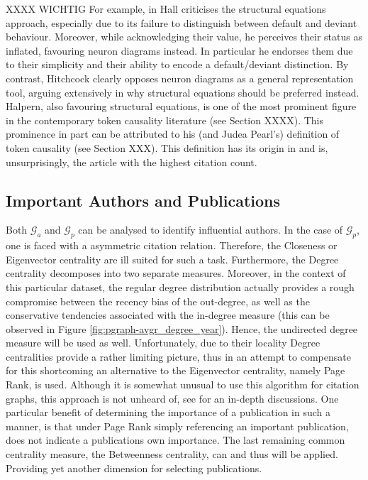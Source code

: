\documentclass[11pt,a4paper]{book}
\theoremstyle{definition}
\theoremstyle{definition}
\theoremstyle{definition}
\theoremstyle{remark}
\newcommand{\pgraph}{\mathcal{G}_{p}}
\newcommand{\agraph}{\mathcal{G}_{a}}
\begin{document}
XXXX WICHTIG For example, in \parencite{hall2007structural} Hall criticises the structural equations approach, especially due to its failure to distinguish between default and deviant behaviour. Moreover, while acknowledging their value, he perceives their status as inflated, favouring neuron diagrams instead. In particular he endorses them due to their simplicity and their ability to encode a default/deviant distinction. By contrast, Hitchcock clearly opposes neuron diagrams as a general representation tool, arguing extensively in \parencite{hitchcock2007s} why structural equations should be preferred instead.
Halpern, also favouring structural equations, is one of the most prominent figure in the contemporary token causality literature (see Section XXXX). This prominence in part can be attributed to his (and Judea Pearl's) definition of token causality (see Section XXX). This definition has its origin in \parencite{halpern2005causes} and is, unsurprisingly, the article with the highest citation count.



\subsection{Important Authors and Publications}
Both $\agraph$ and $\pgraph$ can be analysed to identify influential authors.
In the case of $\pgraph$, one is faced with a asymmetric citation relation. Therefore, the Closeness or Eigenvector centrality are ill suited for such a task.
Furthermore, the Degree centrality decomposes into two separate  measures. Moreover, in the context of this particular dataset, the regular degree distribution actually provides a rough compromise between the recency bias of the out-degree, as well as the conservative tendencies associated with the in-degree measure (this can be observed in Figure \ref{fig:pgraph-avgr_degree_year}). Hence, the undirected degree measure will be used as well. Unfortunately, due to their locality Degree centralities provide a rather limiting picture, thus in an attempt to compensate for this shortcoming an alternative to the Eigenvector centrality, namely Page Rank, is used. Although it is somewhat unusual to use this algorithm for citation graphs, this approach is not unheard of, see \parencite{ding2009pagerank,ma2008bringing,chen2007finding,maslov2008promise,nykl2014pagerank} for an in-depth discussions. One particular benefit of determining the importance of a publication in such a manner, is that under Page Rank simply referencing an important publication, does not indicate a publications own importance. The last remaining common centrality measure, the Betweenness centrality, can and thus will be applied. Providing yet another dimension for selecting publications. 
\end{document}

